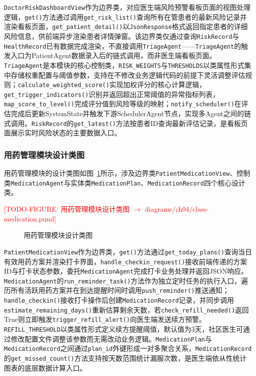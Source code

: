 \texttt{DoctorRiskDashboardView}作为边界类，对应医生端风险预警看板页面的视图处理逻辑，\texttt{get()}方法通过调用\texttt{get\_risk\_list()}查询所有在管患者的最新风险记录并渲染看板页面，\texttt{get\_patient\_detail()}以\texttt{JsonResponse}格式返回指定患者的详细风险信息，供前端异步渲染患者详情弹窗。该边界类仅通过查询\texttt{RiskRecord}与\texttt{HealthRecord}已有数据完成渲染，不直接调用\texttt{TriageAgent}——\texttt{TriageAgent}的触发入口为PatientAgent数据录入后的链式调用，而非医生端看板页面。\texttt{TriageAgent}是本模块的核心控制类，\texttt{RISK\_WEIGHTS}与\texttt{THRESHOLDS}以类属性形式集中存储权重配置与阈值参数，支持在不修改业务逻辑代码的前提下灵活调整评估规则；\texttt{calculate\_weighted\_score()}实现加权评分的核心计算逻辑，\texttt{get\_trigger\_indicators()}识别并返回超出正常阈值的异常指标列表，\texttt{map\_score\_to\_level()}完成评分值到风险等级的映射；\texttt{notify\_scheduler()}在评估完成后更新SystemState并触发下游SchedulerAgent节点，实现多Agent之间的链式调用。\texttt{RiskRecord}的\texttt{get\_latest()}方法按患者ID查询最新评估记录，是看板页面展示实时风险状态的主要数据入口。


\subsubsection{用药管理模块设计类图}

用药管理模块的设计类图如图~\ref{fig:class-medication}所示，涉及边界类\texttt{PatientMedicationView}、控制类\texttt{MedicationAgent}与实体类\texttt{MedicationPlan}、\texttt{MedicationRecord}四个核心设计类。

\todofig{}
\textcolor{red}{[TODO-FIGURE: 用药管理模块设计类图 $\rightarrow$ diagrams/ch04/class-medication.puml]}
\begin{figure}[H]
\centering
\caption{用药管理模块设计类图}
\label{fig:class-medication}
\end{figure}

\texttt{PatientMedicationView}作为边界类，\texttt{get()}方法通过\texttt{get\_today\_plans()}查询当日有效用药方案并渲染打卡界面，\texttt{handle\_checkin\_request()}接收前端传递的方案ID与打卡状态参数，委托\texttt{MedicationAgent}完成打卡业务处理并返回JSON响应。\texttt{MedicationAgent}的\texttt{run\_reminder\_task()}方法作为独立定时任务的执行入口，遍历所有活跃用药方案并在到达提醒时间时调用\texttt{push\_reminder()}推送通知；\texttt{handle\_checkin()}接收打卡操作后创建\texttt{MedicationRecord}记录，并同步调用\texttt{estimate\_remaining\_days()}重新估算剩余天数，若\texttt{check\_refill\_needed()}返回True则立即触发\texttt{trigger\_refill\_alert()}向医生端发送续方预警。\texttt{REFILL\_THRESHOLD}以类属性形式定义续方提醒阈值，默认值为3天，社区医生可通过修改配置文件调整该参数而无需改动业务逻辑。\texttt{MedicationPlan}与\texttt{MedicationRecord}之间通过\texttt{plan\_id}外键形成一对多聚合关系，\texttt{MedicationRecord}的\texttt{get\_missed\_count()}方法支持按天数范围统计漏服次数，是医生端依从性统计图表的底层数据计算入口。



